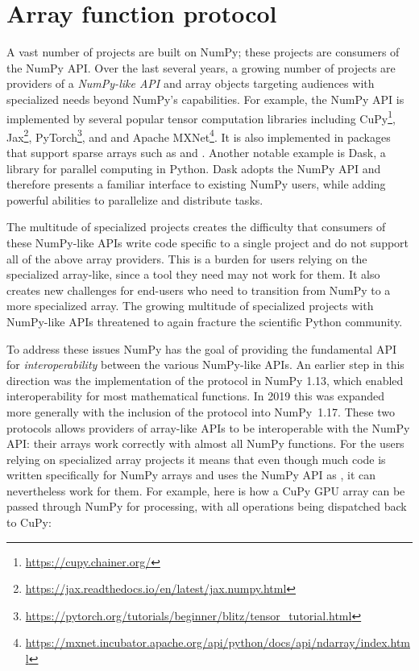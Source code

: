 \section*{Array function protocol}

A vast number of projects are built on NumPy;
these projects are consumers of the NumPy API.
Over the last several years, a growing number of projects are providers of
a \emph{NumPy-like API} and array objects targeting audiences with specialized
needs beyond NumPy's capabilities.
For example, the NumPy API is implemented by several popular tensor computation
libraries including CuPy\footnote{\url{https://cupy.chainer.org/}},
Jax\footnote{\url{https://jax.readthedocs.io/en/latest/jax.numpy.html}},
PyTorch\footnote{\url{https://pytorch.org/tutorials/beginner/blitz/tensor\_tutorial.html}}, and
and Apache MXNet\footnote{\url{https://mxnet.incubator.apache.org/api/python/docs/api/ndarray/index.html}}.
It is also implemented in packages that support sparse arrays
such as  and .
Another notable example is Dask, a library for parallel computing in
Python.  Dask adopts the NumPy API and therefore presents a familiar
interface to existing NumPy users, while adding powerful abilities to
parallelize and distribute tasks.

The multitude of specialized projects creates the difficulty that consumers
of these NumPy-like APIs write code specific to a single project and do not support
all of the above array providers.
This is a burden for users relying on the specialized array-like, since
a tool they need may not work for them.
It also creates new challenges for end-users who need to transition
from NumPy to a more specialized array.
The growing multitude of specialized projects with NumPy-like APIs threatened
to again fracture the scientific Python community.

To address these issues NumPy has the goal of providing the fundamental
API for \emph{interoperability} between the various NumPy-like APIs.
An earlier step in this direction was the implementation of the
 protocol in NumPy 1.13, which enabled interoperability
for most mathematical functions.\cite{NEP13}
In 2019 this was expanded more generally with the inclusion of the
 protocol into NumPy~1.17.
These two protocols allows providers of array-like APIs to be interoperable
with the NumPy API: their arrays work correctly with almost all NumPy functions.\cite{NEP18}
For the users relying on specialized array projects it means that even though
much code is written specifically for NumPy arrays and uses the NumPy API as
, it can nevertheless work for them.  For
example, here is how a CuPy GPU array can be passed through NumPy for
processing, with all operations being dispatched back to CuPy:

